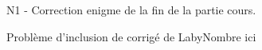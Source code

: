     N1 - Correction enigme de la fin de la partie cours.

    Problème d'inclusion de corrigé de LabyNombre ici
